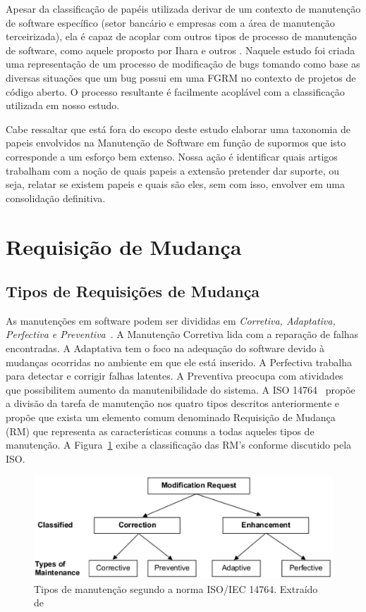 Apesar da classificação de papéis utilizada derivar de um contexto de manutenção
de software específico (setor bancário e empresas com a área de manutenção
terceirizada), ela é capaz de acoplar com outros tipos de processo de manutenção
de software, como aquele proposto por Ihara e outros
\cite{Ihara:2009:AMI:1595808.1595833}. Naquele estudo foi criada uma
representação de um processo de modificação de bugs tomando como base as
diversas situações que um bug possui em uma FGRM no contexto de projetos de
código aberto. O processo resultante é facilmente acoplável com a classificação
utilizada em nosso estudo.

Cabe ressaltar que está fora do escopo deste estudo elaborar uma taxonomia de
papeis envolvidos na Manutenção de Software em função de supormos que isto
corresponde a um esforço bem extenso. Nossa ação é identificar quais artigos
trabalham com a noção de quais papeis a extensão pretender dar suporte, ou seja,
relatar se existem papeis e quais são eles, sem com isso, envolver em uma
consolidação definitiva.
\todoend

\section{Requisição de Mudança}
\label{sec:requisicao_de_mudanca}

\subsection{Tipos de Requisições de Mudança}
\label{subsec:tipos_de_requisicoes_mudanca}

As manutenções em software podem ser divididas em \textit{Corretiva, Adaptativa,
	Perfectiva e Preventiva}~\cite{Lientz:1980:SMM:601062,159342}.  A Manutenção
Corretiva lida com a reparação de falhas encontradas. A Adaptativa tem o foco na
adequação do software devido à mudanças ocorridas no ambiente em que ele está
inserido. A Perfectiva trabalha para detectar e corrigir falhas latentes. A
Preventiva preocupa com atividades que possibilitem aumento da manutenibilidade
do sistema.  A ISO 14764~\cite{1703974} propõe a divisão da tarefa de
manutenção nos quatro tipos descritos anteriormente e propõe que exista um
elemento comum denominado Requisição de Mudança (RM) que representa as
características comuns a todas aqueles tipos de manutenção. A
Figura~\ref{fig:modification-request} exibe a classificação das RM's conforme
discutido pela ISO\@.

\begin{figure}[hbtp] \centering \includegraphics[width=.75\textwidth]
	{./chapter-intro/img/modification_request.eps} \caption{Tipos de manutenção
		segundo a norma ISO/IEC 14764. Extraído de~\cite{1703974}}
\label{fig:modification-request} \end{figure}

